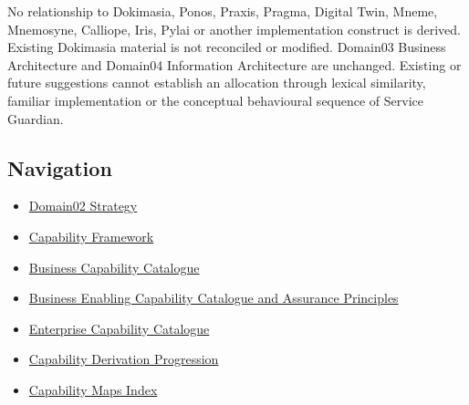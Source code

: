 No relationship to Dokimasia, Ponos, Praxis, Pragma, Digital Twin, Mneme, Mnemosyne, Calliope, Iris, Pylai or another implementation construct is derived. Existing Dokimasia material is not reconciled or modified. Domain03 Business Architecture and Domain04 Information Architecture are unchanged. Existing or future suggestions cannot establish an allocation through lexical similarity, familiar implementation or the conceptual behavioural sequence of Service Guardian.

\label{rad:assurance-strategy:102}
\subsection*{Navigation}
\label{rad:assurance-strategy:104}

\begin{itemize}

\item 
\href{https://github.com/fhirfactory/harmonia/blob/98410db60155198a75f74c79d98060070209faa1/docs/markdown/02-strategy/README.md}{Domain02 Strategy}



\item 
\href{https://github.com/fhirfactory/harmonia/blob/98410db60155198a75f74c79d98060070209faa1/docs/markdown/02-strategy/capabilities/index.md}{Capability Framework}



\item 
\hyperref[rad:business]{Business Capability Catalogue}



\item 
\hyperref[rad:enabling:674]{Business Enabling Capability Catalogue and Assurance Principles}



\item 
\hyperref[rad:enterprise]{Enterprise Capability Catalogue}



\item 
\hyperref[rad:tier-model]{Capability Derivation Progression}



\item 
\href{https://github.com/fhirfactory/harmonia/blob/98410db60155198a75f74c79d98060070209faa1/docs/markdown/02-strategy/capability-maps/index.md}{Capability Maps Index}



\end{itemize}
